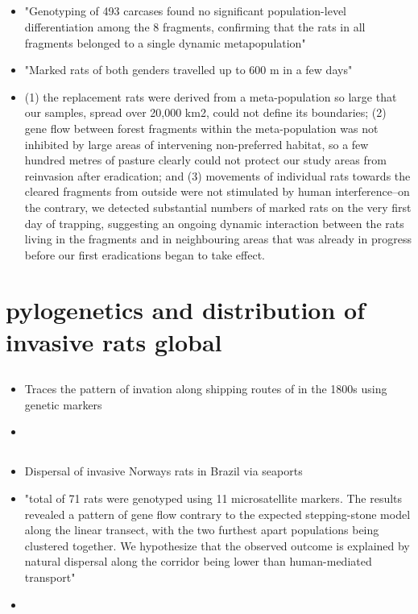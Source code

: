 \documentclass[document.tex]{subfiles}
\begin{document}
    \subsection{}
    \begin{itemize}
    \item "Genotyping of 493 carcases found no significant population-level differentiation among the 8 fragments, confirming that the rats in all fragments belonged to a single dynamic metapopulation"
    \item "Marked rats of both genders travelled up to 600 m in a few days"
    \item (1) the replacement rats were derived from a meta-population so large that our samples, spread over 20,000 km2, could not define its boundaries; (2) gene flow between forest fragments within the meta-population was not inhibited by large areas of intervening non-preferred habitat, so a few hundred metres of pasture clearly could not protect our study areas from reinvasion after eradication; and (3) movements of individual rats towards the cleared fragments from outside were not stimulated by human interference–on the contrary, we detected substantial numbers of marked rats on the very first day of trapping, suggesting an ongoing dynamic interaction between the rats living in the fragments and in neighbouring areas that was already in progress before our first eradications began to take effect.
    \end{itemize}




\section{pylogenetics and distribution of invasive rats global}

    \subsection{}
    \begin{itemize}
    \item Traces the pattern of invation along shipping routes of in the 1800s using genetic markers
    \item 
    \end{itemize}

    \subsection{}
    \begin{itemize}
    \item Dispersal of invasive Norways rats in Brazil via seaports
    \item  "total of 71 rats were genotyped using 11 microsatellite markers. The results revealed a pattern of gene flow contrary to the expected stepping-stone model along the linear transect, with the two furthest apart populations being clustered together. We hypothesize that the observed outcome is explained by natural dispersal along the corridor being lower than human-mediated transport"
    \item 
    \end{itemize}
\end{document}

